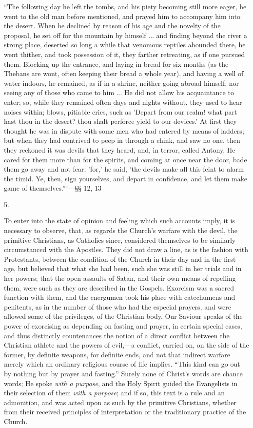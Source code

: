 ``The following day he left the tombs, and his piety becoming
still more eager, he went to the old man before mentioned, and prayed
him to accompany him into the desert. When he declined by reason of
his age and the novelty of the proposal, he set off for the mountain
by himself ... and finding beyond the river a strong place, deserted
so long a while that venomous reptiles abounded there, he went
thither, and took possession of it, they farther retreating, as if one
pursued them. Blocking up the entrance, and laying in bread for six
months (as the Thebans are wont, often keeping their bread a whole
year), and having a well of water indoors, he remained, as if in a
shrine, neither going abroad himself, nor seeing any of those who came
to him ... He did not allow his acquaintance to enter; so, while they
remained often days and nights without, they used to hear noises
within; blows, pitiable cries, such as 'Depart from our realm! what
part hast thou in the desert? thou shalt perforce yield to our
devices.' At first they thought he was in dispute with some men who
had entered by means of ladders; but when they had contrived to peep
in through a chink, and saw no one, then they reckoned it was devils
that they heard, and, in terror, called Antony. He cared for them more
than for the spirits, and coming at once near the door, bade them go
away and not fear; 'for,' he said, 'the devils make all this feint to
alarm the timid. Ye, then, sign yourselves, and depart in confidence,
and let them make game of themselves.'''—§§ 12, 13

5.

To enter into the state of opinion and feeling which such
accounts imply, it is necessary to observe, that, as regards the
Church's warfare with the devil, the primitive Christians, as
Catholics since, considered themselves to be similarly circumstanced
with the Apostles. They did not draw a line, as is the fashion with
Protestants, between the condition of the Church in their day and in
the first age, but believed that what she had been, such she was still
in her trials and in her powers; that the open assaults of Satan, and
their own means of repelling them, were such as they are described in
the Gospels. Exorcism was a sacred function with them, and the
energumen took his place with catechumens and penitents, as in the
number of those who had the especial prayers, and were allowed some of
the privileges, of the Christian body. Our Saviour speaks of the power
of exorcising as depending on fasting and prayer, in certain special
cases, and thus distinctly countenances the notion of a direct
conflict between the Christian athlete and the powers of evil,—a
conflict, carried on, on the side of the former, by definite weapons,
for definite ends, and not that indirect warfare merely which an
ordinary religious course of life implies. ``This kind can go out
by nothing but by prayer and fasting.'' Surely none of Christ's
words are chance words; He spoke \emph{with a purpose}, and the Holy
Spirit guided the Evangelists in their selection of them \emph{with a
purpose}; and if so, this text is a rule and an admonition, and was
acted upon as such by the primitive Christians, whether from their
received principles of interpretation or the traditionary practice of
the Church.

